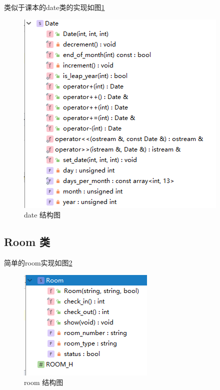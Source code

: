 \documentclass[UTF8]{ctexart}
\begin{document}
类似于课本\cite{textbook}的date类的实现如图\ref{fig:date}

  \begin{figure}%
    \centering%
    \includegraphics[scale = 1]{structure_date.png}
    \caption{date 结构图}%
    \label{fig:date}
  \end{figure}
\subsection{Room 类}

简单的room实现如图\ref{fig:room}

  \begin{figure}%
    \centering%
    \includegraphics[scale = 1]{structure_room.png}
    \caption{room 结构图}%
    \label{fig:room}
  \end{figure}
\end{document}

